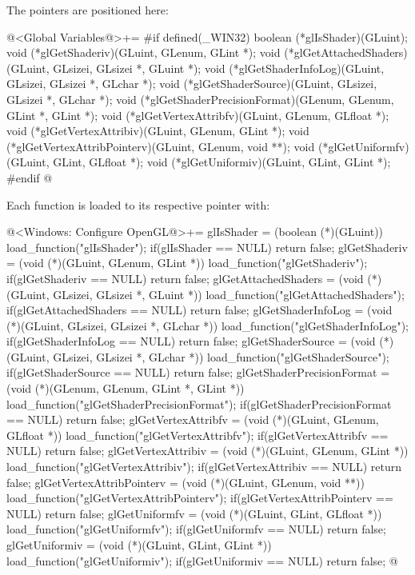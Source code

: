 The pointers are positioned here:

\iniciocodigo
@<Global Variables@>+=
#if defined(_WIN32)
boolean (*glIsShader)(GLuint);
void (*glGetShaderiv)(GLuint, GLenum, GLint *);
void (*glGetAttachedShaders)(GLuint, GLsizei, GLsizei *, GLuint *);
void (*glGetShaderInfoLog)(GLuint, GLsizei, GLsizei *, GLchar *);
void (*glGetShaderSource)(GLuint, GLsizei, GLsizei *, GLchar *);
void (*glGetShaderPrecisionFormat)(GLenum, GLenum, GLint *, GLint *);
void (*glGetVertexAttribfv)(GLuint, GLenum, GLfloat *);
void (*glGetVertexAttribiv)(GLuint, GLenum, GLint *);
void (*glGetVertexAttribPointerv)(GLuint, GLenum, void **);
void (*glGetUniformfv)(GLuint, GLint, GLfloat *);
void (*glGetUniformiv)(GLuint, GLint, GLint *);
#endif
@
\fimcodigo

Each function is loaded to its respective pointer with:

\iniciocodigo
@<Windows: Configure OpenGL@>+=
glIsShader = (boolean (*)(GLuint)) load_function("glIsShader");
if(glIsShader == NULL) return false;
glGetShaderiv = (void (*)(GLuint, GLenum, GLint *))
                   load_function("glGetShaderiv");
if(glGetShaderiv == NULL) return false;
glGetAttachedShaders = (void (*)(GLuint, GLsizei, GLsizei *, GLuint *))
                         load_function("glGetAttachedShaders");
if(glGetAttachedShaders == NULL) return false;
glGetShaderInfoLog = (void (*)(GLuint, GLsizei, GLsizei *, GLchar *))
                         load_function("glGetShaderInfoLog");
if(glGetShaderInfoLog == NULL)  return false;
glGetShaderSource = (void (*)(GLuint, GLsizei, GLsizei *, GLchar *))
                       load_function("glGetShaderSource");
if(glGetShaderSource == NULL) return false;
glGetShaderPrecisionFormat = (void (*)(GLenum, GLenum, GLint *, GLint *))
                                load_function("glGetShaderPrecisionFormat");
if(glGetShaderPrecisionFormat == NULL) return false;
glGetVertexAttribfv = (void (*)(GLuint, GLenum, GLfloat *))
                         load_function("glGetVertexAttribfv");
if(glGetVertexAttribfv == NULL) return false;
glGetVertexAttribiv = (void (*)(GLuint, GLenum, GLint *))
                        load_function("glGetVertexAttribiv");
if(glGetVertexAttribiv == NULL) return false;
glGetVertexAttribPointerv = (void (*)(GLuint, GLenum, void **))
                               load_function("glGetVertexAttribPointerv");
if(glGetVertexAttribPointerv == NULL) return false;
glGetUniformfv = (void (*)(GLuint, GLint, GLfloat *))
                     load_function("glGetUniformfv");
if(glGetUniformfv == NULL) return false;
glGetUniformiv = (void (*)(GLuint, GLint, GLint *))
                     load_function("glGetUniformiv");
if(glGetUniformiv == NULL) return false;
@
\fimcodigo

